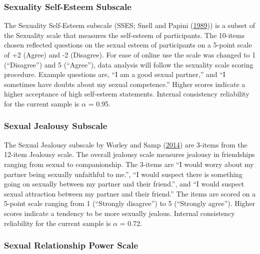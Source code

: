 \documentclass[
  donotrepeattitle,doc, 12pt, a4paper,floatsintext]{apa7}
\begin{document}
\hypertarget{sexuality-self-esteem-subscale}{%
\subsubsection{Sexuality Self-Esteem Subscale}\label{sexuality-self-esteem-subscale}}

The Sexuality Self-Esteem subscale (SSES; Snell and Papini (\protect\hyperlink{ref-snell1989}{1989})) is a subset of the Sexuality scale that measures the self-esteem of participants. The 10-items chosen reflected questions on the sexual esteem of participants on a 5-point scale of +2 (Agree) and -2 (Disagree). For ease of online use the scale was changed to 1 (``Disagree'') and 5 (``Agree''), data analysis will follow the sexuality scale scoring procedure. Example questions are, ``I am a good sexual partner,'' and ``I sometimes have doubts about my sexual competence.'' Higher scores indicate a higher acceptance of high self-esteem statements. Internal consistency reliability for the current sample is \(\alpha\) = 0.95.

\hypertarget{sexual-jealousy-subscale}{%
\subsubsection{Sexual Jealousy Subscale}\label{sexual-jealousy-subscale}}

The Sexual Jealousy subscale by Worley and Samp (\protect\hyperlink{ref-worley2014}{2014}) are 3-items from the 12-item Jealousy scale. The overall jealousy scale measures jealousy in friendships ranging from sexual to companionship. The 3-items are ``I would worry about my partner being sexually unfaithful to me.'', ``I would suspect there is something going on sexually between my partner and their friend.'', and ``I would suspect sexual attraction between my partner and their friend.'' The items are scored on a 5-point scale ranging from 1 (``Strongly disagree'') to 5 (``Strongly agree''). Higher scores indicate a tendency to be more sexually jealous. Internal consistency reliability for the current sample is \(\alpha\) = 0.72.

\hypertarget{sexual-relationship-power-scale}{%
\subsubsection{Sexual Relationship Power Scale}\label{sexual-relationship-power-scale}}
\end{document}
